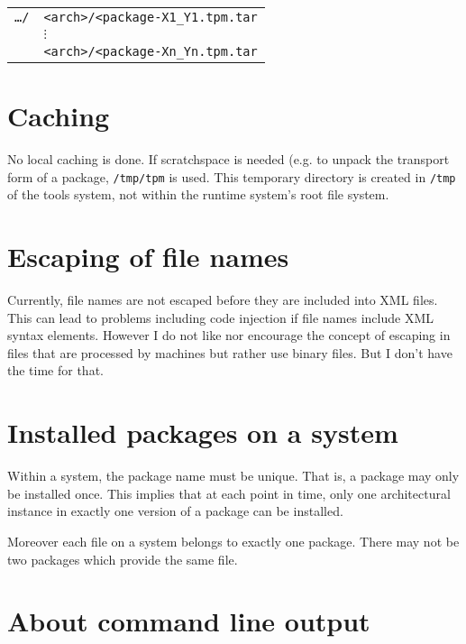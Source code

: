 \documentclass[a4paper]{article}
\newcommand{\file}[1]{\texttt{#1}}
\begin{document}
	\vspace{1em}	
	\noindent
	\begin{tabular}{rl}
		\file{\dots/} & \file{<arch>/<package-X1\_Y1.tpm.tar} \\
		& \hspace{0.5cm} $\vdots$ \\
		& \file{<arch>/<package-Xn\_Yn.tpm.tar} \\
	\end{tabular}

	\section{Caching}
	\label{sec:caching}
	
	No local caching is done. If scratchspace is needed (e.g. to unpack the transport form of a package, \file{/tmp/tpm} is used. This temporary directory is created in \file{/tmp} of the tools system, not within the runtime system's root file system.
	
	\section{Escaping of file names}
	\label{sec:escaping_of_file_names}
	
	Currently, file names are not escaped before they are included into XML files. This can lead to problems including code injection if file names include XML syntax elements. However I do not like nor encourage the concept of escaping in files that are processed by machines but rather use binary files. But I don't have the time for that.
	
	\section{Installed packages on a system}
	\label{sec:installed_packages_on_a_system}
	
	Within a system, the package name must be unique. That is, a package may only be installed once. This implies that at each point in time, only one architectural instance in exactly one version of a package can be installed.
	
	Moreover each file on a system belongs to exactly one package. There may not be two packages which provide the same file.
	
	\section{About command line output}
	\label{sec:about_command_line_output}
	
\end{document}

